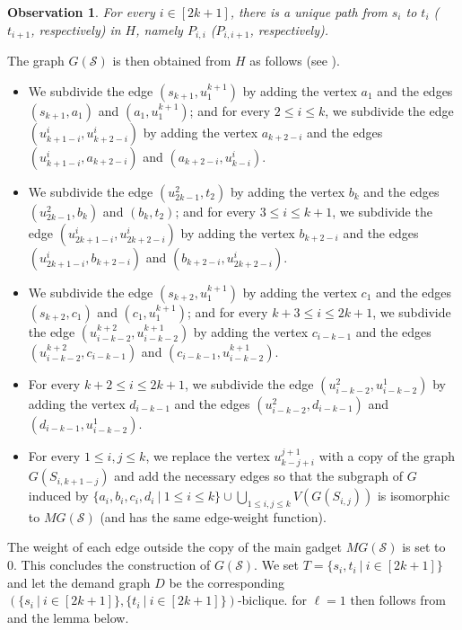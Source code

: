 \documentclass[a4paper,11pt]{article}
\theoremstyle{plain}
\newtheorem{observation}[theorem]{Observation}
\newtheorem{identification rule}{Identification Rule}
\theoremstyle{definition}
\theoremstyle{remark}
\begin{document}
\begin{observation}
\label{obs:uniqupath}
For every $i \in [2k+1]$, there is a unique path from $s_i$ to $t_i$ ($t_{i+1}$, respectively) in $H$, namely $P_{i,i}$ ($P_{i,i+1}$, respectively). 
\end{observation}

\noindent
The graph $G(\mathcal{S})$ is then obtained from $H$ as follows (see ).
\begin{itemize}
\item We subdivide the edge $(s_{k+1},u^{k+1}_1)$ by adding the vertex $a_1$ and the edges $(s_{k+1},a_1)$ and $(a_1,u^{k+1}_1)$; and for every $2 \leq i \leq k$, we subdivide the edge $(u^i_{k+1-i},u^i_{k+2-i})$ by adding the vertex $a_{k+2-i}$ and the edges $(u^i_{k+1-i},a_{k+2-i})$ and $(a_{k+2-i},u^i_{k-i})$.
\item We subdivide the edge $(u^2_{2k-1},t_2)$ by adding the vertex $b_k$ and the edges $(u^2_{2k-1},b_k)$ and $(b_k,t_2)$; and for every $3 \leq i \leq k+1$, we subdivide the edge $(u^i_{2k+1-i},u^i_{2k+2-i})$ by adding the vertex $b_{k+2-i}$ and the edges $(u^i_{2k+1-i},b_{k+2-i})$ and $(b_{k+2-i},u^i_{2k+2-i})$.
\item We subdivide the edge $(s_{k+2},u^{k+1}_1)$ by adding the vertex $c_1$ and the edges $(s_{k+2},c_1)$ and $(c_1,u^{k+1}_1)$; and for every $k+3 \leq i \leq 2k+1$, we subdivide the edge $(u^{k+2}_{i-k-2},u^{k+1}_{i-k-2})$ by adding the vertex $c_{i-k-1}$ and the edges $(u^{k+2}_{i-k-2},c_{i-k-1})$ and $(c_{i-k-1},u^{k+1}_{i-k-2})$.
\item For every $k+2 \leq i \leq 2k+1$, we subdivide the edge $(u^2_{i-k-2},u^1_{i-k-2})$ by adding the vertex $d_{i-k-1}$ and the edges $(u^2_{i-k-2},d_{i-k-1})$ and $(d_{i-k-1},u^1_{i-k-2})$.
\item For every $1\leq i,j \leq k$, we replace the vertex $u^{j+1}_{k-j+i}$ with a copy of the graph $G(S_{i,k+1-j})$ and add the necessary edges so that the subgraph of $G$ induced by $\{a_i,b_i,c_i,d_i~|~ 1 \leq i \leq k\} \cup \bigcup_{1 \leq i,j \leq k} V(G(S_{i,j}))$ is isomorphic to $MG(\mathcal{S})$ (and has the same edge-weight function).
\end{itemize}
The weight of each edge outside the copy of the main gadget $MG(\mathcal{S})$ is set to 0. This concludes the construction of $G(\mathcal{S})$. We set $T = \{s_i,t_i~|~i\in [2k+1]\}$ and let the demand graph $D$ be the corresponding $(\{s_i~|~i \in [2k+1]\},\{t_i~|~i \in [2k+1]\})$-biclique.  for $\ell=1$ then follows from  and the lemma below.
\end{document}
